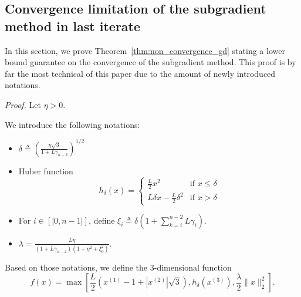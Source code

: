     \subsection{Convergence limitation of the subgradient method in last iterate}
    \label{apx:gd_lower_bound}

        In this section, we prove Theorem~\ref{thm:non_convergence_gd} stating a lower bound guarantee on the convergence of the subgradient method.
        This proof is by far the most technical of this paper due to the amount of newly introduced notations.
        
        \nonconvergenceofgdwithlowerboundedstepsizes*
        
        \noindent \textit{Proof.}
            Let $\eta > 0$.
            
            We introduce the following notations:
            \begin{itemize}
                \item $\delta \triangleq \left(\frac{\eta\sqrt{3}}{1+L\gamma_{n-2}}\right)^{1/2}$
                
                \item Huber function
                \begin{equation}
                    h_{\delta}(x) = 
                    \begin{cases}
                        \frac{L}{2}x^2 & \text{if } x \leq \delta \\
                        L \delta x - \frac{L}{2}\delta^2 & \text{if } x > \delta
                    \end{cases}
                    \label{eq:huber_functions}
                \end{equation}
        
                \item For $i \in [|0, n-1|]$, define $\xi_i \triangleq \delta \left( 1 + \sum_{k=i}^{n-2} L \gamma_i \right)$.
                
                \item $\lambda = \frac{L\eta}{(1 + L\gamma_{n-2})(1 + \eta^2 + \xi_0^2)}$.
            \end{itemize}
            
            Based on those notations, we define the $3$-dimensional function
            \begin{equation}
                f(x) = \max\left[\frac{L}{2}\left(x^{(1)} - 1 + |x^{(2)}|\sqrt{3}\right), h_{\delta}\left(x^{(3)}\right), \frac{\lambda}{2}\|x\|_2^2\right].
            \end{equation}
            
